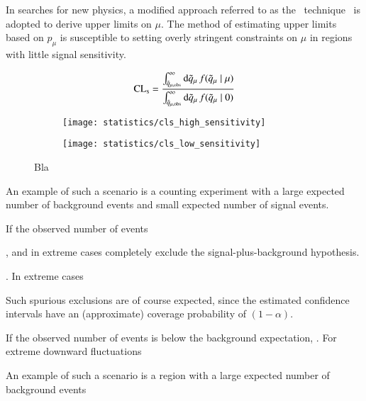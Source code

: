 In searches for new physics, a modified approach referred to as the
\CLs~technique~\cite{Junk:1999kv,Read:2002hq} is adopted to derive upper limits
on $\mu$. The method of estimating upper limits based on $p_\mu$ is susceptible
to setting overly stringent constraints on $\mu$ in regions with little signal
sensitivity.


\begin{align*}
  \text{CL}_{\text{s}} = \frac
  {\int_{\tilde{q}_{\mu, \text{obs}}}^{\infty} \mathrm{d}\tilde{q}_{\mu} \, f(\tilde{q}_{\mu} \mid \mu)}
  {\int_{\tilde{q}_{\mu, \text{obs}}}^\infty \mathrm{d}\tilde{q}_{\mu} \, f(\tilde{q}_{\mu} \mid 0)}
\end{align*}


\begin{figure}[htbp]
  \centering

  \begin{subfigure}{0.46\textwidth}
    \texttt{[image: statistics/cls\_high\_sensitivity]}
    \caption{}
  \end{subfigure}\hfill%
  \begin{subfigure}{0.46\textwidth}
    \texttt{[image: statistics/cls\_low\_sensitivity]}
    \caption{}
  \end{subfigure}

  \caption{Bla}
\end{figure}

An example of
such a scenario is a counting experiment with a large expected number of
background events and small expected number of signal events.


If the observed number of events


, and in extreme cases completely exclude the signal-plus-background hypothesis.




. In extreme cases




Such spurious exclusions are of course expected, since the estimated confidence
intervals have an (approximate) coverage probability of $(1 - \alpha)$.






If the observed number of events is below the background expectation, . For extreme downward fluctuations




An example of such a scenario is a region with a large expected number of
background events



